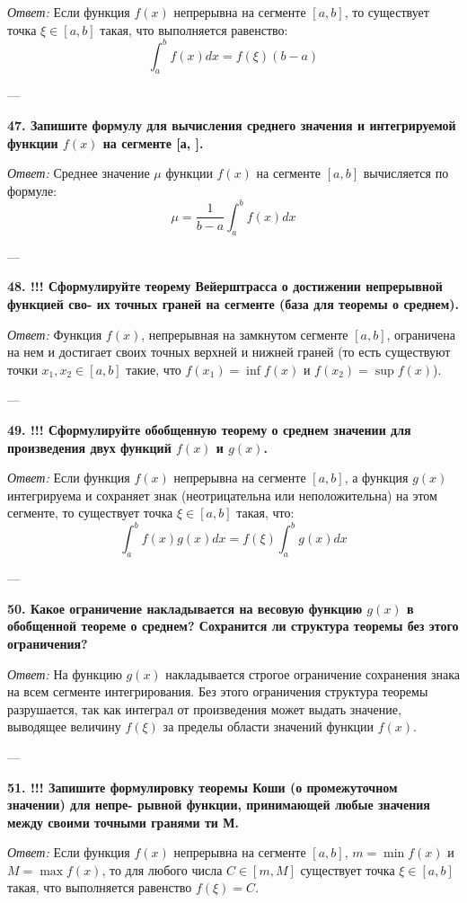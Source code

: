 \documentclass{article}
\begin{document}
\textit{Ответ:} Если функция $f(x)$ непрерывна на сегменте $[a, b]$, то существует точка $\xi \in [a, b]$ такая, что выполняется равенство:
$$ \int_a^b f(x) dx = f(\xi)(b - a) $$

---

\textbf{47. Запишите формулу для вычисления среднего значения и интегрируемой функции $f(x)$ на сегменте [а, ].}

\textit{Ответ:} Среднее значение $\mu$ функции $f(x)$ на сегменте $[a, b]$ вычисляется по формуле:
$$ \mu = \frac{1}{b - a} \int_a^b f(x) dx $$

---

\textbf{48. !!! Сформулируйте теорему Вейерштрасса о достижении непрерывной функцией сво- их точных граней на сегменте (база для теоремы о среднем).}

\textit{Ответ:} Функция $f(x)$, непрерывная на замкнутом сегменте $[a, b]$, ограничена на нем и достигает своих точных верхней и нижней граней (то есть существуют точки $x_1, x_2 \in [a, b]$ такие, что $f(x_1) = \inf f(x)$ и $f(x_2) = \sup f(x)$).

---

\textbf{49. !!! Сформулируйте обобщенную теорему о среднем значении для произведения двух функций $f(x)$ и $g(x)$.}

\textit{Ответ:} Если функция $f(x)$ непрерывна на сегменте $[a, b]$, а функция $g(x)$ интегрируема и сохраняет знак (неотрицательна или неположительна) на этом сегменте, то существует точка $\xi \in [a, b]$ такая, что:
$$ \int_a^b f(x)g(x) dx = f(\xi) \int_a^b g(x) dx $$

---

\textbf{50. Какое ограничение накладывается на весовую функцию $g(x)$ в обобщенной теореме о среднем? Сохранится ли структура теоремы без этого ограничения?}

\textit{Ответ:} На функцию $g(x)$ накладывается строгое ограничение сохранения знака на всем сегменте интегрирования. Без этого ограничения структура теоремы разрушается, так как интеграл от произведения может выдать значение, выводящее величину $f(\xi)$ за пределы области значений функции $f(x)$.

---

\textbf{51. !!! Запишите формулировку теоремы Коши (о промежуточном значении) для непре- рывной функции, принимающей любые значения между своими точными гранями ти М.}

\textit{Ответ:} Если функция $f(x)$ непрерывна на сегменте $[a, b]$, $m = \min f(x)$ и $M = \max f(x)$, то для любого числа $C \in [m, M]$ существует точка $\xi \in [a, b]$ такая, что выполняется равенство $f(\xi) = C$.
\end{document}
